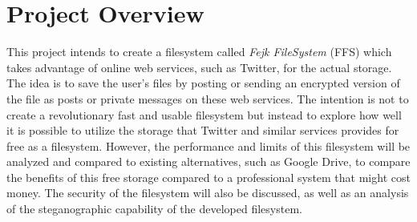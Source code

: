 \section{Project Overview}

This project intends to create a filesystem called \textit{Fejk FileSystem} (FFS) which takes advantage of online web services, such as Twitter, for the actual storage. The idea is to save the user's files by posting or sending an encrypted version of the file as posts or private messages on these web services. The intention is not to create a revolutionary fast and usable filesystem but instead to explore how well it is possible to utilize the storage that Twitter and similar services provides for free as a filesystem. However, the performance and limits of this filesystem will be analyzed and compared to existing alternatives, such as Google Drive, to compare the benefits of this free storage compared to a professional system that might cost money. The security of the filesystem will also be discussed, as well as an analysis of the steganographic capability of the developed filesystem.